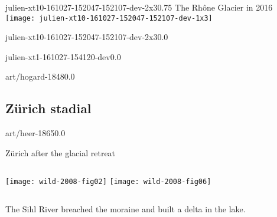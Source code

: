 \begin{CJK}{UTF8}{min}
    \begin{backgroundframe}{julien-xt10-161027-152047-152107-dev-2x3}{0.75}
                           {The Rhône Glacier in 2016}
      \vspace{12mm}
      \texttt{[image: julien-xt10-161027-152047-152107-dev-1x3]}
    \end{backgroundframe}

    \begin{backgroundframe}[b]{julien-xt10-161027-152047-152107-dev-2x3}{0.0}{}
      \flushleft{}
    \end{backgroundframe}

    \begin{backgroundframe}[b]{julien-xt1-161027-154120-dev}{0.0}{}
      \flushleft{}
    \end{backgroundframe}

    \begin{backgroundframe}[b]{art/hogard-1848}{0.0}{}
      \flushleft{}
    \end{backgroundframe}


\subsection{Zürich stadial}

    \begin{backgroundframe}[t]{art/heer-1865}{0.0}{}
      \flushleft{}
    \end{backgroundframe}

    \begin{frame}{Zürich after the glacial retreat}
      \begin{columns}
        \column{60mm}
          \texttt{[image: wild-2008-fig02]}
        \column{60mm}
          \texttt{[image: wild-2008-fig06]}
      \end{columns}
      \bigskip
      The Sihl River breached the moraine and built a delta in the lake.
    \end{frame}



\end{CJK}
